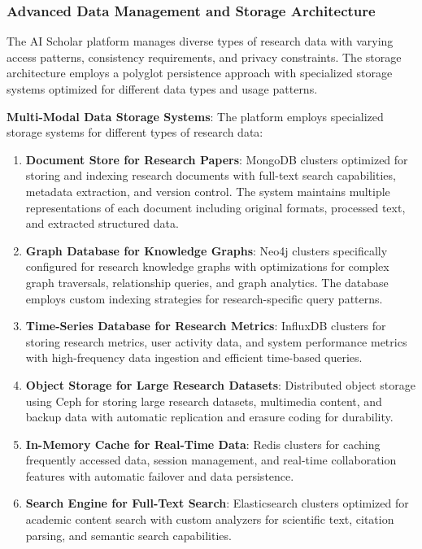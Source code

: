 \documentclass[10pt,twocolumn]{article}
\begin{document}
\subsubsection{Advanced Data Management and Storage Architecture}

The AI Scholar platform manages diverse types of research data with varying access patterns, consistency requirements, and privacy constraints. The storage architecture employs a polyglot persistence approach with specialized storage systems optimized for different data types and usage patterns.

\textbf{Multi-Modal Data Storage Systems}: The platform employs specialized storage systems for different types of research data:

\begin{enumerate}
    \item \textbf{Document Store for Research Papers}: MongoDB clusters optimized for storing and indexing research documents with full-text search capabilities, metadata extraction, and version control. The system maintains multiple representations of each document including original formats, processed text, and extracted structured data.
    
    \item \textbf{Graph Database for Knowledge Graphs}: Neo4j clusters specifically configured for research knowledge graphs with optimizations for complex graph traversals, relationship queries, and graph analytics. The database employs custom indexing strategies for research-specific query patterns.
    
    \item \textbf{Time-Series Database for Research Metrics}: InfluxDB clusters for storing research metrics, user activity data, and system performance metrics with high-frequency data ingestion and efficient time-based queries.
    
    \item \textbf{Object Storage for Large Research Datasets}: Distributed object storage using Ceph for storing large research datasets, multimedia content, and backup data with automatic replication and erasure coding for durability.
    
    \item \textbf{In-Memory Cache for Real-Time Data}: Redis clusters for caching frequently accessed data, session management, and real-time collaboration features with automatic failover and data persistence.
    
    \item \textbf{Search Engine for Full-Text Search}: Elasticsearch clusters optimized for academic content search with custom analyzers for scientific text, citation parsing, and semantic search capabilities.
\end{enumerate}
\end{document}

